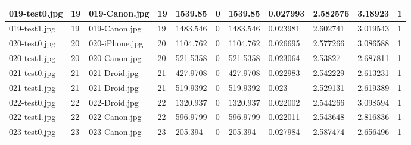 \begin{landscape}
\begin{longtable}{|p{2cm}|p{1cm}|p{2cm}|p{1cm}|p{2cm}|p{1cm}|p{2cm}|p{2cm}|p{2cm}|p{2cm}|p{1cm}|}
		019-test0.jpg   & 19               & 019-Canon.jpg         & 19                          & 1539.85               & 0                       & 1539.85                    & 0.027993              & 2.582576              & 3.18923                  & 1                \\ \hline
		019-test1.jpg   & 19               & 019-Canon.jpg         & 19                          & 1483.546              & 0                       & 1483.546                   & 0.023981              & 2.602741              & 3.019543                 & 1                \\ \hline
		020-test0.jpg   & 20               & 020-iPhone.jpg        & 20                          & 1104.762              & 0                       & 1104.762                   & 0.026695              & 2.577266              & 3.086588                 & 1                \\ \hline
		020-test1.jpg   & 20               & 020-Canon.jpg         & 20                          & 521.5358              & 0                       & 521.5358                   & 0.023064              & 2.53827               & 2.687811                 & 1                \\ \hline
		021-test0.jpg   & 21               & 021-Droid.jpg         & 21                          & 427.9708              & 0                       & 427.9708                   & 0.022983              & 2.542229              & 2.613231                 & 1                \\ \hline
		021-test1.jpg   & 21               & 021-Droid.jpg         & 21                          & 519.9392              & 0                       & 519.9392                   & 0.023                 & 2.529131              & 2.619389                 & 1                \\ \hline
		022-test0.jpg   & 22               & 022-Droid.jpg         & 22                          & 1320.937              & 0                       & 1320.937                   & 0.022002              & 2.544266              & 3.098594                 & 1                \\ \hline
		022-test1.jpg   & 22               & 022-Canon.jpg         & 22                          & 596.9799              & 0                       & 596.9799                   & 0.022011              & 2.543648              & 2.816836                 & 1                \\ \hline
		023-test0.jpg   & 23               & 023-Canon.jpg         & 23                          & 205.394               & 0                       & 205.394                    & 0.027984              & 2.587474              & 2.656496                 & 1                \\ \hline

\end{longtable}
\end{landscape}
